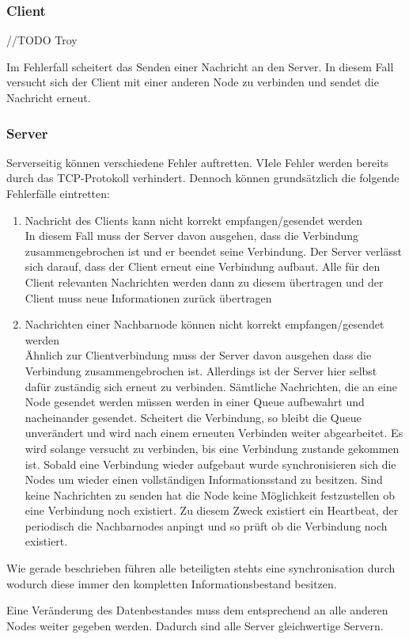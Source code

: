 \subsubsection{Client}
//TODO Troy

Im Fehlerfall scheitert das Senden einer Nachricht an den Server. In diesem Fall versucht sich der Client mit einer anderen Node zu verbinden und sendet die Nachricht erneut.

\subsubsection{Server}
Serverseitig können verschiedene Fehler auftretten. VIele Fehler werden bereits durch das TCP-Protokoll verhindert. Dennoch können grundsätzlich die folgende Fehlerfälle eintretten:
\begin{enumerate}
    \item Nachricht des Clients kann nicht korrekt empfangen/gesendet werden\\
        In diesem Fall muss der Server davon ausgehen, dass die Verbindung zusammengebrochen ist und er beendet seine Verbindung. Der Server verlässt sich darauf, dass der Client erneut eine Verbindung aufbaut. Alle für den Client relevanten Nachrichten werden dann zu diesem übertragen und der Client muss neue Informationen zurück übertragen
    \item Nachrichten einer Nachbarnode können nicht korrekt empfangen/gesendet werden\\
        Ähnlich zur Clientverbindung muss der Server davon ausgehen dass die Verbindung zusammengebrochen ist. Allerdings ist der Server hier selbst dafür zuständig sich erneut zu verbinden. Sämtliche Nachrichten, die an eine Node gesendet werden müssen werden in einer Queue aufbewahrt und nacheinander gesendet. Scheitert die Verbindung, so bleibt die Queue unverändert und wird nach einem erneuten Verbinden weiter abgearbeitet. Es wird solange versucht zu verbinden, bis eine Verbindung zustande gekommen ist. Sobald eine Verbindung wieder aufgebaut wurde synchronisieren sich die Nodes um wieder einen vollständigen Informationsstand zu besitzen.
        Sind keine Nachrichten zu senden hat die Node keine Möglichkeit festzustellen ob eine Verbindung noch existiert. Zu diesem Zweck existiert ein Heartbeat, der periodisch die Nachbarnodes anpingt und so prüft ob die Verbindung noch existiert.
\end{enumerate}
Wie gerade beschrieben führen alle beteiligten stehts eine synchronisation durch wodurch diese immer den kompletten Informationsbestand besitzen.

Eine Veränderung des Datenbestandes muss dem entsprechend an alle anderen Nodes weiter gegeben werden. Dadurch sind alle Server gleichwertige Servern.




